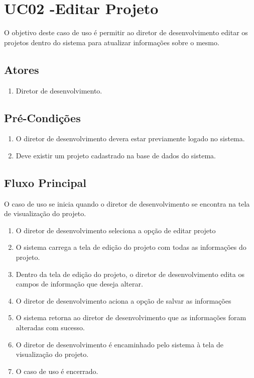 \section{UC02 -Editar Projeto}

O objetivo deste caso de uso é permitir ao diretor de desenvolvimento editar os projetos dentro do sistema para atualizar informações sobre o mesmo.

\subsection{Atores}

\begin{enumerate}
  \item Diretor de desenvolvimento.
\end{enumerate}

\subsection{Pré-Condições}
\begin{enumerate}
  \item O diretor de desenvolvimento devera estar previamente logado no sistema.
  \item Deve existir um projeto cadastrado na base de dados do sistema.
\end{enumerate}

\subsection{Fluxo Principal}
O caso de uso se inicia quando o diretor de desenvolvimento se encontra na tela de visualização do projeto.

\begin{enumerate}
  \item O diretor de desenvolvimento seleciona a opção de editar projeto
  \item O sistema carrega a tela de edição do projeto com todas as informações do projeto.
  \item Dentro da tela de edição do projeto, o diretor de desenvolvimento edita os campos de informação que deseja alterar.
  \item O diretor de desenvolvimento aciona a opção de salvar as informações
  \item O sistema retorna ao diretor de desenvolvimento que as informações foram alteradas com sucesso.
  \item O diretor de desenvolvimento é encaminhado pelo sistema à tela de visualização do projeto.
  \item O caso de uso é encerrado.
\end{enumerate}

